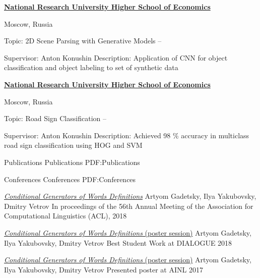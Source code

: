 \documentclass[letterpaper,MMMyyyy,nonstopmode]{simpleresumecv}
\begin{document}
\begin{Body}
\Gap

\Entry
\href{https://www.hse.ru/en/}
{\textbf{National Research University Higher School of Economics}}
\par
Moscow, Russia

\Gap
\BulletItem
Topic: 2D Scene Parsing with Generative Models
\hfill
{} --
\begin{Detail}
\SubBulletItem
Supervisor:
Anton Konushin
\SubBulletItem
Description:
Application of CNN for object classification and object labeling to \newline
set of synthetic data
\end{Detail}

\Gap

\Entry
\href{https://www.hse.ru/en/}
{\textbf{National Research University Higher School of Economics}}
\par
Moscow, Russia

\Gap
\BulletItem
Topic: Road Sign Classification
\hfill
{} --
\begin{Detail}
\SubBulletItem
Supervisor:
Anton Konushin
\SubBulletItem
Description:
Achieved 98 \% accuracy in multiclass road sign classification \newline
using HOG and SVM
\end{Detail}

\newpage

\Section
{Publications}
{Publications}
{PDF:Publications}

\SubSection
{Conferences}
{Conferences}
{PDF:Conferences}


\Gap
\Item
\href{https://aclanthology.info/papers/P18-2043/p18-2043}{\textit{Conditional Generators of Words Definitions}}
\Item
Artyom Gadetsky, Ilya Yakubovsky, Dmitry Vetrov
\Item
In proceedings of the 56th Annual Meeting of the \newline
Association for Computational Linguistics (ACL), 2018

\Item
\href{http://www.dialog-21.ru/en/}{\textit{Conditional Generators of Words Definitions} (poster session)}
\Item
Artyom Gadetsky, Ilya Yakubovsky, Dmitry Vetrov
\Item
Best Student Work at DIALOGUE 2018

\Gap
\Item
\href{http://ainlconf.ru/2017}{\textit{Conditional Generators of Words Definitions} (poster session)}
\Item
Artyom Gadetsky, Ilya Yakubovsky, Dmitry Vetrov
\Item
Presented poster at AINL 2017



\end{Body}
\end{document}
